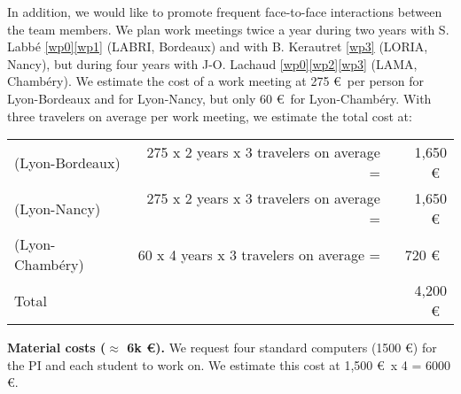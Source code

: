 In addition, we would like to promote frequent face-to-face interactions between the team members.
We plan work meetings twice a year during two years with
S. Labb\'{e} \ref{wp0}\ref{wp1} (LABRI, Bordeaux) and
with B. Kerautret \ref{wp3} (LORIA, Nancy),
but during four years
with J-O. Lachaud \ref{wp0}\ref{wp2}\ref{wp3} (LAMA, Chamb\'{e}ry).
We estimate the cost of a work meeting at 275 \euro~per person
for Lyon-Bordeaux and for Lyon-Nancy,
but only 60 \euro~for Lyon-Chamb\'{e}ry.
With three travelers on average per work meeting, we estimate the total cost at:

\begin{tabular}{lrr}
  (Lyon-Bordeaux) & 275 x 2 years x 3 travelers on average =& 1,650 \euro~\\ 
  (Lyon-Nancy) & 275 x 2 years x 3 travelers on average =& 1,650 \euro~\\
  (Lyon-Chamb\'{e}ry) & 60 x 4 years x 3 travelers on average =& 720 \euro~\\
  Total & ~ & 4,200 \euro~\\
\end{tabular}

\textbf{Material costs ($\approx$ 6k \euro).}
We request four standard computers (1500 \euro) for the PI and each student to work on.
We estimate this cost at 1,500 \euro~x 4 = 6000 \euro. 

